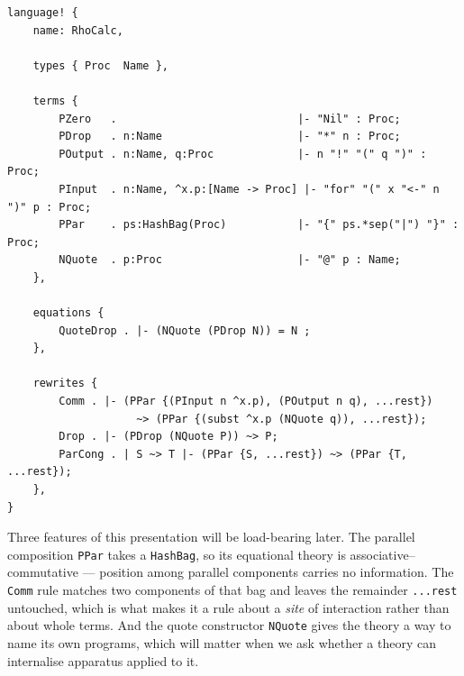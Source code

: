 \begin{lstlisting}
language! {
    name: RhoCalc,

    types { Proc  Name },

    terms {
        PZero   .                            |- "Nil" : Proc;
        PDrop   . n:Name                     |- "*" n : Proc;
        POutput . n:Name, q:Proc             |- n "!" "(" q ")" : Proc;
        PInput  . n:Name, ^x.p:[Name -> Proc] |- "for" "(" x "<-" n ")" p : Proc;
        PPar    . ps:HashBag(Proc)           |- "{" ps.*sep("|") "}" : Proc;
        NQuote  . p:Proc                     |- "@" p : Name;
    },

    equations {
        QuoteDrop . |- (NQuote (PDrop N)) = N ;
    },

    rewrites {
        Comm . |- (PPar {(PInput n ^x.p), (POutput n q), ...rest})
                    ~> (PPar {(subst ^x.p (NQuote q)), ...rest});
        Drop . |- (PDrop (NQuote P)) ~> P;
        ParCong . | S ~> T |- (PPar {S, ...rest}) ~> (PPar {T, ...rest});
    },
}
\end{lstlisting}

Three features of this presentation will be load-bearing later. The parallel composition
\texttt{PPar} takes a \texttt{HashBag}, so its equational theory is
associative--commutative --- position among parallel components carries no information.
The \texttt{Comm} rule matches two components of that bag and leaves the remainder
\texttt{...rest} untouched, which is what makes it a rule about a \emph{site} of
interaction rather than about whole terms. And the quote constructor \texttt{NQuote}
gives the theory a way to name its own programs, which will matter when we ask whether a
theory can internalise apparatus applied to it.

